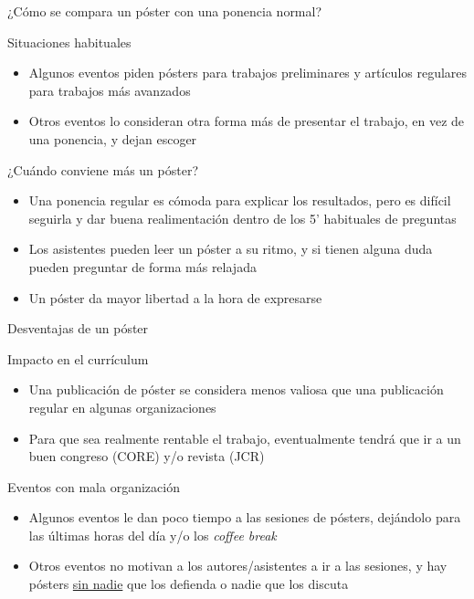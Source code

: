 \documentclass[xcolor=svgnames,compress]{beamer}
\begin{document}
\begin{frame}{¿Cómo se compara un póster con una ponencia normal?}

  \begin{block}{Situaciones habituales}
    \begin{itemize}
    \item Algunos eventos piden pósters para trabajos preliminares y
      artículos regulares para trabajos más avanzados
    \item Otros eventos lo consideran otra forma más de presentar el
      trabajo, en vez de una ponencia, y dejan escoger
    \end{itemize}
  \end{block}

  \begin{block}{¿Cuándo conviene más un póster?}
    \begin{itemize}
    \item Una ponencia regular es cómoda para explicar los resultados,
      pero es difícil seguirla y dar buena realimentación dentro de
      los 5' habituales de preguntas
    \item Los asistentes pueden leer un póster a su ritmo, y si
      tienen alguna duda pueden preguntar de forma más relajada
    \item Un póster da mayor libertad a la hora de expresarse
    \end{itemize}
  \end{block}

\end{frame}

\begin{frame}{Desventajas de un póster}

  \begin{block}{Impacto en el currículum}
    \begin{itemize}
    \item Una publicación de póster se considera menos valiosa que una
      publicación regular en algunas organizaciones
    \item Para que sea realmente rentable el trabajo, eventualmente
      tendrá que ir a un buen congreso (CORE) y/o revista (JCR)
    \end{itemize}
  \end{block}

  \begin{block}{Eventos con mala organización}
    \begin{itemize}
    \item Algunos eventos le dan poco tiempo a las sesiones de
      pósters, dejándolo para las últimas horas del día y/o los
      \emph{coffee break}
    \item Otros eventos no motivan a los autores/asistentes a ir a las
      sesiones, y hay pósters
      \href{http://www.flickr.com/photos/jepoirrier/488699487/}{sin
        nadie} que los defienda o nadie que los discuta
    \end{itemize}
  \end{block}

\end{frame}
\end{document}
